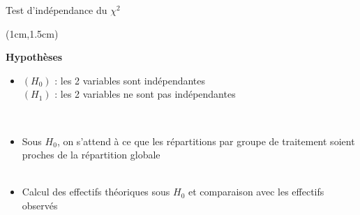 \documentclass{beamer}
\begin{document}

\begin{frame}{Test d'indépendance du $\chi^2$}
\begin{textblock*}{\textwidth}(1cm,1.5cm)

\begin{center}{\bf \Large Hypothèses} \end{center}

\begin{itemize}
\item $(H_0)$ : les 2 variables sont indépendantes \\ 
\vspace{0.2cm}
$(H_1)$ : les 2 variables ne sont pas indépendantes \

\

\item Sous $H_0$, on s'attend à ce que les répartitions par groupe de traitement soient proches de la répartition globale \\

\

\item Calcul des effectifs théoriques sous $H_0$ et comparaison avec les effectifs observés
\end{itemize}

\end{textblock*}

\end{frame}

\end{document}
